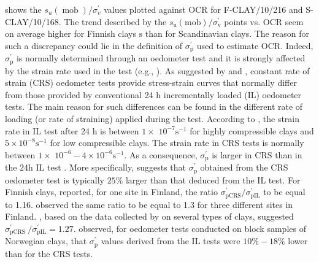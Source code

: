 \begin{ParaColumn}
    \switchcolumn*

     shows the $s_{u}(\operatorname{mob}) / \sigma_{v}^{\prime}$ values plotted against OCR for F-CLAY/10/216 and S-CLAY/10/168. The trend described by the $s_{\mathrm{u}}(\mathrm{mob}) / \sigma_{\mathrm{v}}^{\prime}$ points vs. OCR seem on average higher for Finnish clays $\mathrm{s}$ than for Scandinavian clays. The reason for such a discrepancy could lie in the definition of $\sigma_{\mathrm{p}}^{\prime}$ used to estimate OCR. Indeed, $\sigma_{\mathrm{p}}^{\prime}$ is normally determined through an oedometer test and it is strongly affected by the strain rate used in the test (e.g., \citet{Leroueil1983477,Leroueil1985159}). As suggested by \citet{Leroueil1985159} and \citet{Leroueil198885,Leroueil1996534}, constant rate of strain (CRS) oedometer tests provide stress-strain curves that normally differ from those provided by conventional 24 h incrementally loaded (IL) oedometer tests. The main reason for such differences can be found in the different rate of loading (or rate of straining) applied during the test. According to \citet{Leroueil1996534}, the strain rate in IL test after 24 h is between $1 \times$ $10^{-7} \mathrm{s}^{-1}$ for highly compressible clays and $5 \times 10^{-8} \mathrm{s}^{-1}$ for low compressible clays. The strain rate in CRS tests is normally between $1 \times$ $10^{-6}-4 \times 10^{-6} \mathrm{s}^{-1} .$ As a consequence, $\sigma_{\mathrm{p}}^{\prime}$ is larger in CRS than in the $24 \mathrm{h}$ IL test \citep{Leroueil1996534}. More specifically, \citet{Leroueil1996534} suggests that $\sigma_{\mathrm{p}}^{\prime}$ obtained from the CRS oedometer test is typically $25 \%$ larger than that deduced from the IL test. For Finnish clays, \citet{Kolisoja198961} reported, for one site in Finland, the ratio $\sigma_{\mathrm{pCRS}}^{\prime} / \sigma_{\mathrm{pIL}}^{\prime}$ to be equal to 1.16. \citet{Hoikkala1991} observed the same ratio to be equal to 1.3 for three different sites in Finland. \citet{Länsivaara1999}, based on the data collected by \citet{Leroueil1996534} on several types of clays, suggested $\sigma_{\text {pCRS }}^{\prime}/\sigma_{\mathrm{pIL}}^{\prime}=1.27 .$ \citet{Karlsrud20131273} observed, for oedometer tests conducted on block samples of Norwegian clays, that $\sigma_{\mathrm{p}}^{\prime}$ values derived from the IL tests were $10 \%-18 \%$ lower than for the CRS tests.

    \switchcolumn


\end{ParaColumn}
